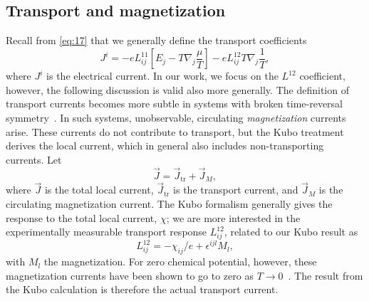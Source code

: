 \subsection{Transport and magnetization}
\label{sec:transport-magnetization}
Recall from \cref{eq:17} that we generally define the transport coefficients
\[
J^i = -e L_{ij}^{11} \left[
          E_j - T \nabla_j \frac{\mu}{T}
  \right] - e L^{12}_{ij} T \nabla_j \frac{1}{T},
\]
where \( J^i \) is the electrical current.
In our work, we focus on the \( L^{12} \) coefficient, however, the following discussion is valid also more generally.
The definition of transport currents becomes more subtle in systems with broken time-reversal symmetry~\cite{vanderwurffMagnetovorticalThermoelectricTransport2019, chernodubThermalTransportGeometry2021}.
In such systems, unobservable, circulating \emph{magnetization} currents arise.
These currents do not contribute to transport, but the Kubo treatment derives the local current, which in general also includes non-transporting currents.
Let
\begin{equation}
  \label{eq:23}
  \vec{J} = \vec{J}_{\text{tr}} + \vec{J}_M,
\end{equation}
where \( \vec{J} \) is the total local current, \( \vec{J}_{\text{tr}} \) is the transport current, and \( \vec{J}_M \) is the circulating magnetization current.
The Kubo formalism generally gives the response to the total local current, \( \chi \);
we are more interested in the experimentally measurable transport response \( L_{ij}^{12} \), related to our Kubo result as~\cite{chernodubThermalTransportGeometry2021}
\begin{equation}
  \label{eq:24}
  L^{12}_{ij} = -\chi_{ij} /e + \epsilon^{ijl} M_l,
\end{equation}
with \( M_l \) the magnetization.
For zero chemical potential, however, these magnetization currents have been shown to go to zero as \( T \to 0 \)~\cite{vanderwurffMagnetovorticalThermoelectricTransport2019}.
The result from the Kubo calculation is therefore the actual transport current.


